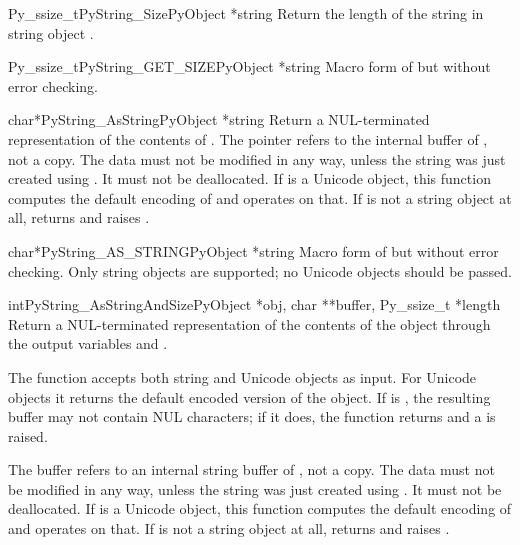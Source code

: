 \begin{cfuncdesc}{Py_ssize_t}{PyString_Size}{PyObject *string}
  Return the length of the string in string object .
\end{cfuncdesc}

\begin{cfuncdesc}{Py_ssize_t}{PyString_GET_SIZE}{PyObject *string}
  Macro form of  but without error
  checking.
\end{cfuncdesc}

\begin{cfuncdesc}{char*}{PyString_AsString}{PyObject *string}
  Return a NUL-terminated representation of the contents of
  .  The pointer refers to the internal buffer of
  , not a copy.  The data must not be modified in any way,
  unless the string was just created using
  .
  It must not be deallocated.  If  is a Unicode object,
  this function computes the default encoding of  and
  operates on that.  If  is not a string object at all,
   returns \NULL{} and raises
  .
\end{cfuncdesc}

\begin{cfuncdesc}{char*}{PyString_AS_STRING}{PyObject *string}
  Macro form of  but without error
  checking.  Only string objects are supported; no Unicode objects
  should be passed.
\end{cfuncdesc}

\begin{cfuncdesc}{int}{PyString_AsStringAndSize}{PyObject *obj,
                                                 char **buffer,
                                                 Py_ssize_t *length}
  Return a NUL-terminated representation of the contents of the
  object  through the output variables  and
  .

  The function accepts both string and Unicode objects as input. For
  Unicode objects it returns the default encoded version of the
  object.  If  is \NULL{}, the resulting buffer may not
  contain NUL characters; if it does, the function returns 
  and a  is raised.

  The buffer refers to an internal string buffer of , not a
  copy. The data must not be modified in any way, unless the string
  was just created using .  It must not be deallocated.  If  is a
  Unicode object, this function computes the default encoding of
   and operates on that.  If  is not a string
  object at all,  returns
   and raises .
\end{cfuncdesc}

